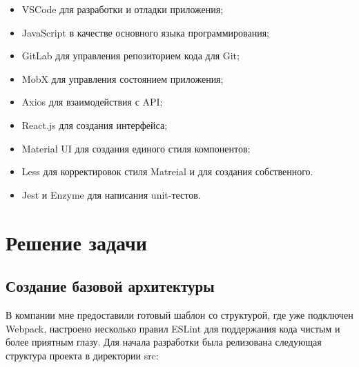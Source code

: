 \documentclass[a4paper,12pt]{diplom}
\begin{document}
\begin{itemize}
  \item VSCode для разработки и отладки приложения;
  \item JavaScript в качестве основного языка программирования;
  \item GitLab для управления репозиторием кода для Git;
  \item MobX для управления состоянием приложения;
  \item Axios для взаимодействия с API;
  \item React.js для создания интерфейса;
  \item Material UI для создания единого стиля компонентов;
  \item Less для корректировок стиля Matreial и для создания собственного.
  \item Jest и Enzyme для написания unit-тестов.
\end{itemize}

\chapter{Решение задачи}

\section{Создание базовой архитектуры}
В компании мне предоставили готовый шаблон со структурой, где уже подключен Webpack, настроено несколько правил ESLint для поддержания кода чистым и более приятным глазу.
Для начала разработки была релизована следующая структура проекта в директории src:

\renewcommand*\DTstyle{\ttfamily\textcolor{black}}
\end{document}
